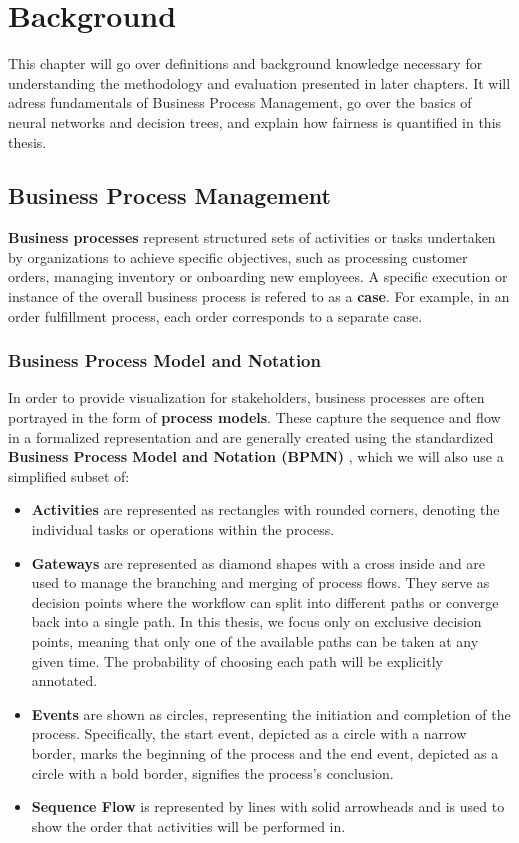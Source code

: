 \chapter{Background}
This chapter will go over definitions and background knowledge
necessary for understanding the methodology and evaluation presented in later chapters.
It will adress fundamentals of Business Process Management, go over the basics of neural networks and decision trees,
and explain how fairness is quantified in this thesis.

\section{Business Process Management}
\textbf{Business processes} represent structured sets of activities
or tasks undertaken by organizations to achieve specific objectives,
such as processing customer orders, managing inventory or onboarding new employees.
A specific execution or instance of the overall business process is refered to as a \textbf{case}.
For example, in an order fulfillment process, each order corresponds to a separate case.

\subsection{Business Process Model and Notation}
In order to provide visualization for stakeholders,
business processes are often portrayed in the form of \textbf{process models}.
These capture the sequence and flow in a formalized representation
and are generally created using the standardized
\textbf{Business Process Model and Notation (BPMN)} \cite{bpmn},
which we will also use a simplified subset of:

\begin{itemize}
\item \textbf{Activities} are represented as rectangles with rounded corners,
denoting the individual tasks or operations within the process.
\item \textbf{Gateways} are represented as diamond shapes with a cross inside and are used to manage the branching and merging of process flows.
They serve as decision points where the workflow can split into different paths or converge back into a single path.
In this thesis, we focus only on exclusive decision points, meaning that only one of the available paths can be taken at any given time.
The probability of choosing each path will be explicitly annotated.
\item \textbf{Events} are shown as circles,
representing the initiation and completion of the process.
Specifically, the start event,
depicted as a circle with a narrow border, marks the beginning of the process
and the end event, depicted as a circle with a bold border, signifies the process's conclusion.
\item \textbf{Sequence Flow} is represented by lines with solid arrowheads
and is used to show the order that activities will be performed in.
\end{itemize}

